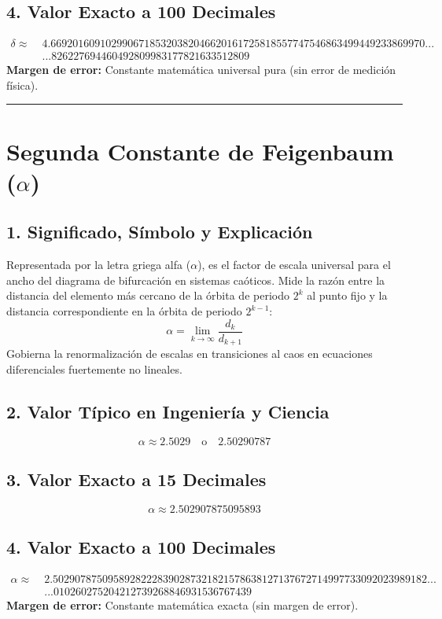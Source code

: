 \documentclass[12pt,a4paper]{article}
\begin{document}
\subsection*{4. Valor Exacto a 100 Decimales}
\begin{align*}
\delta \approx \; & 4.66920160910299067185320382046620161725818557747546863499449233869970... \\
& ...826227694460492809983177821633512809
\end{align*}
\textbf{Margen de error:} Constante matemática universal pura (sin error de medición física).

\vspace{0.8cm}
\hrule
\vspace{0.8cm}

\section{Segunda Constante de Feigenbaum ($\alpha$)}

\subsection*{1. Significado, Símbolo y Explicación}
Representada por la letra griega alfa ($\alpha$), es el factor de escala universal para el ancho del diagrama de bifurcación en sistemas caóticos. Mide la razón entre la distancia del elemento más cercano de la órbita de periodo $2^k$ al punto fijo y la distancia correspondiente en la órbita de periodo $2^{k-1}$:
\begin{equation*}
\alpha = \lim_{k \to \infty} \frac{d_k}{d_{k+1}}
\end{equation*}
Gobierna la renormalización de escalas en transiciones al caos en ecuaciones diferenciales fuertemente no lineales.

\subsection*{2. Valor Típico en Ingeniería y Ciencia}
\begin{equation*}
\alpha \approx 2.5029 \quad \text{o} \quad 2.50290787
\end{equation*}

\subsection*{3. Valor Exacto a 15 Decimales}
\begin{equation*}
\alpha \approx 2.502907875095893
\end{equation*}

\subsection*{4. Valor Exacto a 100 Decimales}
\begin{align*}
\alpha \approx \; & 2.50290787509589282228390287321821578638127137672714997733092023989182... \\
& ...010260275204212739268846931536767439
\end{align*}
\textbf{Margen de error:} Constante matemática exacta (sin margen de error).
\end{document}

